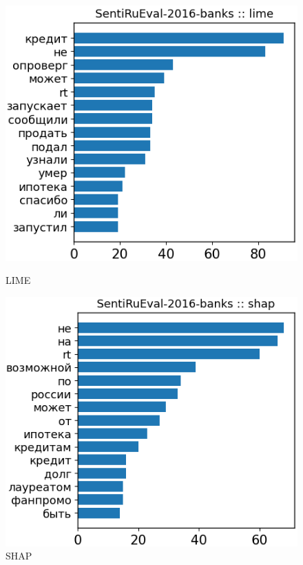 \begin{figure}[H]
\centering
\begin{minipage}[b]{0.49\textwidth}
\centering
\includegraphics[width=\textwidth]{pictures/examples_banks/dict3.png} %
\caption{LIME}
\end{minipage}
\hfill
\begin{minipage}[b]{0.49\textwidth}
\centering
\includegraphics[width=\textwidth]{pictures/examples_banks/dict4.png} %
\caption{SHAP}
\end{minipage}
\end{figure}

